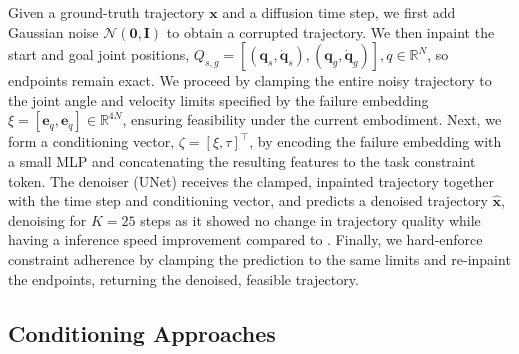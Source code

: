 Given a ground-truth trajectory $\mathbf{x}$ and a diffusion time step, we first add Gaussian noise $\mathcal{N}(\mathbf{0}, \mathbf{I})$ to obtain a corrupted trajectory. We then inpaint the start and goal joint positions, $Q_{s,g} = [{(\textbf{q}_s, \dot{\textbf{q}}_s), (\textbf{q}_g, \dot{\textbf{q}}_g)}], q \in \mathbb{R}^N$, so endpoints remain exact. We proceed by clamping the entire noisy trajectory to the joint angle and velocity limits specified by the failure embedding $\xi = [\mathbf{e}_q, \mathbf{e}_{\dot{q}}] \in \mathbb{R}^{4N}$, ensuring feasibility under the current embodiment. Next, we form a conditioning vector, $\zeta = [\xi, \tau]^\top $,  by encoding the failure embedding with a small MLP and concatenating the resulting features to the task constraint token. The denoiser (UNet) receives the clamped, inpainted trajectory together with the time step and conditioning vector, and predicts a denoised trajectory $\hat{\mathbf{x}}$, denoising for $K=25$ steps as it showed no change in trajectory quality while having a inference speed improvement compared to \cite{chi2023diffusion}. Finally, we hard-enforce constraint adherence by clamping the prediction to the same limits and re-inpaint the endpoints, returning the denoised, feasible trajectory.


\subsection{Conditioning Approaches}

